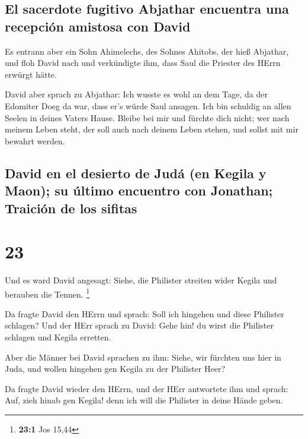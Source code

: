 \hypertarget{el-sacerdote-fugitivo-abjathar-encuentra-una-recepciuxf3n-amistosa-con-david}{%
\subsection{El sacerdote fugitivo Abjathar encuentra una recepción
amistosa con
David}\label{el-sacerdote-fugitivo-abjathar-encuentra-una-recepciuxf3n-amistosa-con-david}}

 Es entrann aber ein Sohn Ahimelechs, des Sohnes Ahitobs,
der hieß Abjathar, und floh David nach  und verkündigte
ihm, dass Saul die Priester des HErrn erwürgt hätte.

 David aber sprach zu Abjathar: Ich wusste es wohl an dem
Tage, da der Edomiter Doeg da war, dass er's würde Saul ansagen. Ich bin
schuldig an allen Seelen in deines Vaters Hause.  Bleibe
bei mir und fürchte dich nicht; wer nach meinem Leben steht, der soll
auch nach deinem Leben stehen, und sollst mit mir bewahrt werden.

\hypertarget{david-en-el-desierto-de-juduxe1-en-kegila-y-maon-su-uxfaltimo-encuentro-con-jonathan-traiciuxf3n-de-los-sifitas}{%
\subsection{David en el desierto de Judá (en Kegila y Maon); su último
encuentro con Jonathan; Traición de los
sifitas}\label{david-en-el-desierto-de-juduxe1-en-kegila-y-maon-su-uxfaltimo-encuentro-con-jonathan-traiciuxf3n-de-los-sifitas}}

\hypertarget{section-22}{%
\section{23}\label{section-22}}

 Und es ward David angesagt: Siehe, die Philister streiten
wider Kegila und berauben die Tennen. \footnote{\textbf{23:1} Jos 15,44}

 Da fragte David den HErrn und sprach: Soll ich hingehen
und diese Philister schlagen? Und der HErr sprach zu David: Gehe hin! du
wirst die Philister schlagen und Kegila erretten.

 Aber die Männer bei David sprachen zu ihm: Siehe, wir
fürchten uns hier in Juda, und wollen hingehen gen Kegila zu der
Philister Heer?

 Da fragte David wieder den HErrn, und der HErr antwortete
ihm und sprach: Auf, zieh hinab gen Kegila! denn ich will die Philister
in deine Hände geben.

